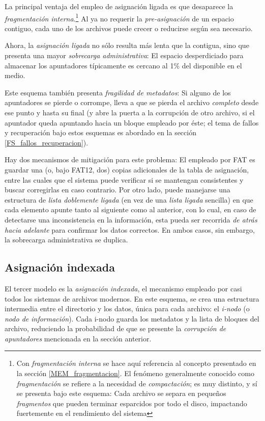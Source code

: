 \documentclass[11pt,fleqn]{book} %
\begin{document}
La principal ventaja del empleo de asignación ligada es que desaparece
la \emph{fragmentación interna}.\footnote{Con \emph{fragmentación interna} se hace
aquí referencia al concepto presentado en la sección
\ref{MEM_fragmentacion}. El fenómeno generalmente conocido como
\emph{fragmentación} se refiere a la necesidad de \emph{compactación}; es muy
distinto, y sí se presenta bajo este esquema: Cada archivo se separa
en pequeños \emph{fragmentos} que pueden terminar esparcidos por todo el
disco, impactando fuertemente en el rendimiento del sistema } Al ya no
requerir la \emph{pre-asignación} de un espacio contiguo, cada uno de los
archivos puede crecer o reducirse según sea necesario.

Ahora, la \emph{asignación ligada} no sólo resulta más lenta que la
contigua, sino que presenta una mayor \emph{sobrecarga administrativa}: El
espacio desperdiciado para almacenar los apuntadores típicamente es
cercano al 1\% del disponible en el medio.

Este esquema también presenta \emph{fragilidad de metadatos}: Si alguno de
los apuntadores se pierde o corrompe, lleva a que se pierda el archivo
\emph{completo} desde ese punto y hasta su final (y abre la puerta a la
corrupción de otro archivo, si el apuntador queda apuntando hacia un
bloque empleado por éste; el tema de fallos y recuperación bajo estos
esquemas es abordado en la sección \ref{FS_fallos_recuperacion}).

Hay dos mecanismos de mitigación para este problema: El empleado por
FAT es guardar una (o, bajo FAT12, dos) copias adicionales de la tabla
de asignación, entre las cuales que el sistema puede verificar si se
mantengan consistentes y buscar corregirlas en caso contrario. Por
otro lado, puede manejarse una estructura de \emph{lista doblemente ligada}
(en vez de una \emph{lista ligada} sencilla) en que cada elemento apunte
tanto al siguiente como al anterior, con lo cual, en caso de
detectarse una inconsistencia en la información, esta pueda ser
recorrida \emph{de atrás hacia adelante} para confirmar los datos
correctos. En ambos casos, sin embargo, la sobrecarga administrativa
se duplica.
\subsection{Asignación indexada}
\label{sec-7-2-3}


El tercer modelo es la \emph{asignación indexada}, el mecanismo empleado
por casi todos los sistemas de archivos modernos. En este esquema, se
crea una estructura intermedia entre el directorio y los datos, única
para cada archivo: el \emph{i-nodo} (o \emph{nodo de información}). Cada i-nodo
guarda los metadatos y la lista de bloques del archivo, reduciendo la
probabilidad de que se presente la \emph{corrupción de apuntadores}
mencionada en la sección anterior.
\end{document}
